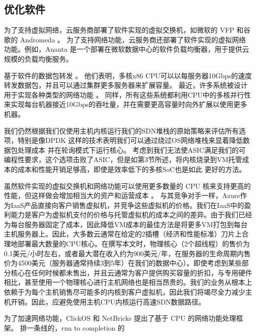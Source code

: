 \subsection{优化软件}

为了支持虚拟网络，云服务商部署了软件实现的虚拟交换机，如微软的 VFP \cite{firestone2017vfp} 和谷歌的 Andromeda \cite{andromeda}。
为了支持网络功能，云服务商还部署了软件实现的虚拟网络功能。例如，Ananta \cite {ananta} 是一个部署在微软数据中心的软件负载均衡器，用于提供云规模的负载均衡服务。


基于软件的数据包转发 \cite {routebricks,Egi:2008:THP:1544012.1544032}。
他们表明，多核x86 CPU可以以每服务器10Gbps的速度转发数据包，并且可以通过集群更多服务器来扩展容量。
最近，许多系统被设计用于实现各种类型的网络功能 \cite {comb,Greenhalgh:2009:FPR:1517480.1517484,martins2014clickos}。
同样，所有这些系统都利用CPU中的多核并行性来实现每台机器接近10Gbps的吞吐量，并在需要更高容量时向外扩展以使用更多机器。



我们仍然根据我们仅使用主机内核运行我们的SDN堆栈的原始策略来评估所有选项，特别是像DPDK \cite{dpdk} 这样的技术表明我们可以通过绕过OS网络堆栈来显着降低数据包处理成本 并在轮询模式下运行核心。 考虑到我们无法使ASIC满足我们的可编程性要求，这个选项击败了ASIC，但是如第3节所述，将内核烧录到VM托管成本的成本和性能开销足够高，即使是效率低下的多核SoC也是如此 更好的方法。

虽然软件实现的虚拟交换机和网络功能可以使用更多数量的 CPU 核来支持更高的性能，但这样做会增加相当大的资产和运营成本 \cite {ananta,duet}。
与其竞争对手一样，Azure作为IaaS产品直接向客户销售虚拟机，并竞争这些虚拟机的价格。我们在IaaS中的盈利能力是客户为虚拟机支付的价格与托管虚拟机的成本之间的差异。由于我们已经为每台服务器固定了成本，因此降低VM成本的最佳方法是将更多VM打包到每台主机服务器上。因此，大多数云通常在给定的2插槽（经济和性能标准）刀片上合理地部署最大数量的CPU核心。在撰写本文时，物理核心（2个超线程）的售价为0.1美元/小时左右，或者最大潜在收入约为900美元/年，在服务器的生命周期内售价为4500美元（服务器通常持续3到5年）在我们的数据中心）。即使考虑到某些部分核心在任何时候都未售出，并且云通常为客户提供购买容量的折扣，与专用硬件相比，甚至使用一个物理核心进行主机网络也是相当昂贵的。我们的业务从根本上依赖于为每个主机销售尽可能多的内核到客户虚拟机，因此我们将竭尽全力减少主机开销。因此，应避免使用主机CPU内核运行高速SDN数据路径。


为了加速网络功能，ClickOS \cite{martins2014clickos} 和 NetBricks \cite{netbricks} 提出了基于 CPU 的网络功能处理框架。
排一条线的，run to completion 的



